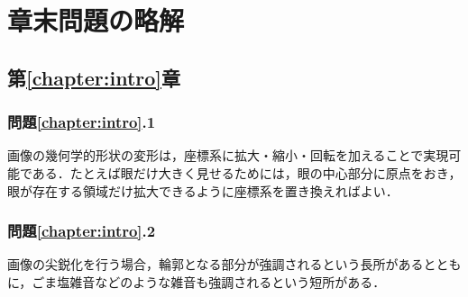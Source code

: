 








\section*{章末問題の略解}
\subsection*{第\ref{chapter:intro}章}

\subsubsection*{問題\ref{chapter:intro}.1}

画像の幾何学的形状の変形は，座標系に拡大・縮小・回転を加えることで実現可能である．たとえば眼だけ大きく見せるためには，眼の中心部分に原点をおき，眼が存在する領域だけ拡大できるように座標系を置き換えればよい．

\subsubsection*{問題\ref{chapter:intro}.2}

画像の尖鋭化を行う場合，輪郭となる部分が強調されるという長所があるとともに，ごま塩雑音などのような雑音も強調されるという短所がある．

